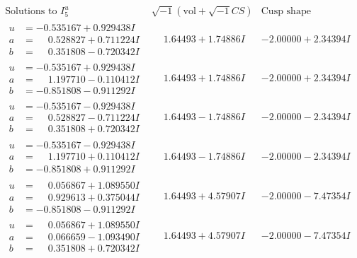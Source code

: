 \documentclass[1p]{elsarticle_modified}
\theoremstyle{definition}
\newcommand{\I}{\sqrt{-1}}
\begin{document}
$$\begin{array}{c|c|c}  
\text{Solutions to }I^u_{5}& \I (\text{vol} + \sqrt{-1}CS) & \text{Cusp shape}\\
 \hline 
\begin{aligned}
u &= -0.535167 + 0.929438 I \\
a &= \phantom{-}0.528827 + 0.711224 I \\
b &= \phantom{-}0.351808 - 0.720342 I\end{aligned}
 & \phantom{-}1.64493 + 1.74886 I & -2.00000 + 2.34394 I \\ \hline\begin{aligned}
u &= -0.535167 + 0.929438 I \\
a &= \phantom{-}1.197710 - 0.110412 I \\
b &= -0.851808 - 0.911292 I\end{aligned}
 & \phantom{-}1.64493 + 1.74886 I & -2.00000 + 2.34394 I \\ \hline\begin{aligned}
u &= -0.535167 - 0.929438 I \\
a &= \phantom{-}0.528827 - 0.711224 I \\
b &= \phantom{-}0.351808 + 0.720342 I\end{aligned}
 & \phantom{-}1.64493 - 1.74886 I & -2.00000 - 2.34394 I \\ \hline\begin{aligned}
u &= -0.535167 - 0.929438 I \\
a &= \phantom{-}1.197710 + 0.110412 I \\
b &= -0.851808 + 0.911292 I\end{aligned}
 & \phantom{-}1.64493 - 1.74886 I & -2.00000 - 2.34394 I \\ \hline\begin{aligned}
u &= \phantom{-}0.056867 + 1.089550 I \\
a &= \phantom{-}0.929613 + 0.375044 I \\
b &= -0.851808 - 0.911292 I\end{aligned}
 & \phantom{-}1.64493 + 4.57907 I & -2.00000 - 7.47354 I \\ \hline\begin{aligned}
u &= \phantom{-}0.056867 + 1.089550 I \\
a &= \phantom{-}0.066659 - 1.093490 I \\
b &= \phantom{-}0.351808 + 0.720342 I\end{aligned}
 & \phantom{-}1.64493 + 4.57907 I & -2.00000 - 7.47354 I \\ \hline\begin{aligned}

\end{aligned}
\end{array}$$
\end{document}
